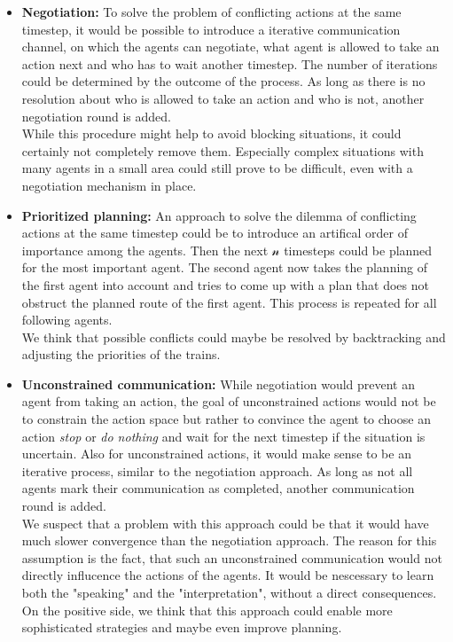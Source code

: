 \begin{itemize}
	\item \textbf{Negotiation:} To solve the problem of conflicting actions at the same timestep, it would be possible to introduce a iterative communication channel, on which the agents can negotiate, what agent is allowed to take an action next and who has to wait another timestep. The number of iterations could be determined by the outcome of the process. As long as there is no resolution about who is allowed to take an action and who is not, another negotiation round is added.\\
	While this procedure might help to avoid blocking situations, it could certainly not completely remove them. Especially complex situations with many agents in a small area could still prove to be difficult, even with a negotiation mechanism in place.

	\item \textbf{Prioritized planning:} An approach to solve the dilemma of conflicting actions at the same timestep could be to introduce an artifical order of importance among the agents. Then the next $\mathcal{n}$ timesteps could be planned for the most important agent. The second agent now takes the planning of the first agent into account and tries to come up with a plan that does not obstruct the planned route of the first agent. This process is repeated for all following agents.\\
	We think that possible conflicts could maybe be resolved by backtracking and adjusting the priorities of the trains.	
	
	\item \textbf{Unconstrained communication:} While negotiation would prevent an agent from taking an action, the goal of unconstrained actions would not be to constrain the action space but rather to convince the agent to choose an action \textit{stop} or \textit{do nothing} and wait for the next timestep if the situation is uncertain. Also for unconstrained actions, it would make sense to be an iterative process, similar to the negotiation approach. As long as not all agents mark their communication as completed, another communication round is added.\\
	We suspect that a problem with this approach could be that it would have much slower convergence than the negotiation approach. The reason for this assumption is the fact, that such an unconstrained communication would not directly influcence the actions of the agents. It would be nescessary to learn both the "speaking" and the "interpretation", without a direct consequences. On the positive side, we think that this approach could enable more sophisticated strategies and maybe even improve planning.
	

\end{itemize}
